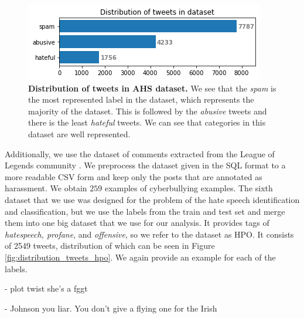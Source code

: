\documentclass[fleqn,moreauthors,10pt]{ds_report}
\newcommand\bm{0.2pt}
\begin{document}
\begin{figure}[ht]\centering
	\includegraphics[width=\linewidth]{distribution_tweets_dataset2.png}
	\caption{\textbf{Distribution of tweets in AHS dataset.} We see that the \textit{spam} is the most represented label in the dataset, which represents the majority of the dataset. This is followed by the \textit{abusive} tweets and there is the least \textit{hateful} tweets. We can see that categories in this dataset are well represented.}
	\label{fig:distribution_tweets_dataset2}
\end{figure}

\noindent Additionally, we use the dataset of comments extracted from the League of Legends community \cite{bretschneider2016detecting}. We preprocess the dataset given in the SQL format to a more readable CSV form and keep only the posts that are annotated as harassment. We obtain $259$ examples of cyberbullying examples. The sixth dataset that we use was designed for the problem of the hate speech identification and classification, but we use the labels from the train and test set and merge them into one big dataset that we use for our analysis. It provides tags of \textit{hatespeech, profane}, and \textit{offensive}, so we refer to the dataset as HPO. It consists of 2549 tweets, distribution of which can be seen in Figure \ref{fig:distribution_tweets_hpo}. We again provide an example for each of the labels.

\begin{tcolorbox}[colback=black!8, width=0.9\linewidth, center,arc=8pt,sharp corners=downhill, boxrule=0.3pt, left=\bm, top=\bm, right=\bm, bottom=\bm, fontupper=\small]
 - plot twist she's a fggt
\end{tcolorbox}

\begin{tcolorbox}[width=0.9\linewidth, center,arc=8pt,sharp corners=downhill, boxrule=0.3pt, left=\bm, top=\bm, right=\bm, bottom=\bm, fontupper=\small]
 - Johnson you liar. You don't give a flying one for the Irish
\end{tcolorbox}
\end{document}
